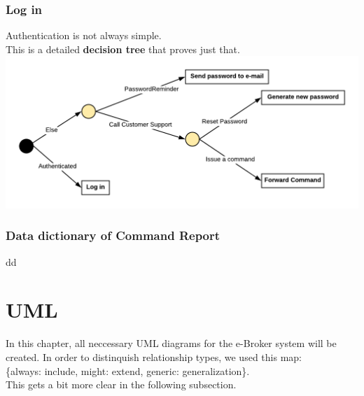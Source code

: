 \documentclass{article}
\begin{document}
\subsubsection{Log in}
Authentication is not always simple.\\
This is a detailed \textbf{decision tree} that proves just that.\\
\hspace*{5mm}\includegraphics[scale=0.4]{decisionTree} 

\subsubsection{Data dictionary of Command Report}
dd

\newpage
\section{UML}
In this chapter, all neccessary UML diagrams for the e-Broker system will be created. In order to distinquish relationship types, we used this map: \\\hspace*{16mm}\{always: include, might: extend, generic: generalization\}. \\
This gets a bit more clear in the following subsection. 
\end{document}
